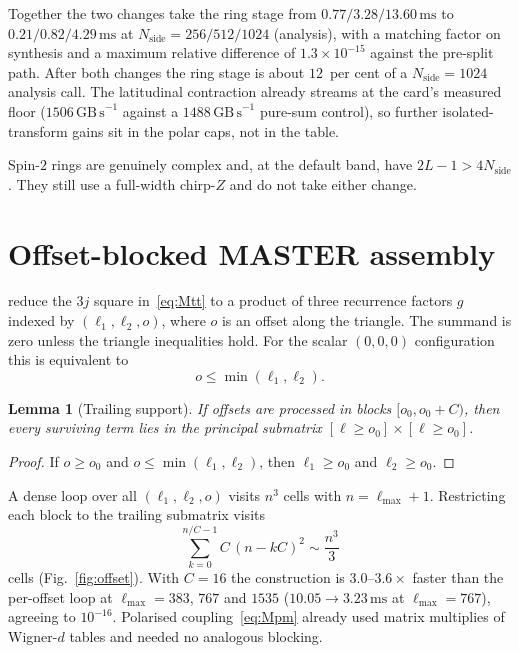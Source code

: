 \documentclass[usenatbib,useAMS]{mnras}
\newtheorem{lemma}{Lemma}
\begin{document}
Together the two changes take the ring stage from $0.77/3.28/13.60\,\mathrm{ms}$ to $0.21/0.82/4.29\,\mathrm{ms}$ at $N_{\mathrm{side}}=256/512/1024$ (analysis), with a matching factor on synthesis and a maximum relative difference of $1.3\times10^{-15}$ against the pre-split path. After both changes the ring stage is about $12$~per cent of a $N_{\mathrm{side}}=1024$ analysis call. The latitudinal contraction already streams at the card's measured floor ($1506\,\mathrm{GB\,s}^{-1}$ against a $1488\,\mathrm{GB\,s}^{-1}$ pure-sum control), so further isolated-transform gains sit in the polar caps, not in the table.

Spin-$2$ rings are genuinely complex and, at the default band, have $2L-1>4N_{\mathrm{side}}$. They still use a full-width chirp-$Z$ and do not take either change.

\section{Offset-blocked MASTER assembly}

\citet{kiddier2026} reduce the $3j$ square in~\eqref{eq:Mtt} to a product of three recurrence factors $g$ indexed by $(\ell_1,\ell_2,o)$, where $o$ is an offset along the triangle. The summand is zero unless the triangle inequalities hold. For the scalar $(0,0,0)$ configuration this is equivalent to
\begin{equation}
  o\le\min(\ell_1,\ell_2).
  \label{eq:offset}
\end{equation}

\begin{lemma}[Trailing support]
If offsets are processed in blocks $[o_0,o_0+C)$, then every surviving term lies in the principal submatrix $[\ell\ge o_0]\times[\ell\ge o_0]$.
\end{lemma}

\begin{proof}
If $o\ge o_0$ and $o\le\min(\ell_1,\ell_2)$, then $\ell_1\ge o_0$ and $\ell_2\ge o_0$.
\end{proof}

A dense loop over all $(\ell_1,\ell_2,o)$ visits $n^3$ cells with $n=\ell_{\max}+1$. Restricting each block to the trailing submatrix visits
\begin{equation}
  \sum_{k=0}^{n/C-1} C\,(n-kC)^2 \sim \frac{n^3}{3}
\end{equation}
cells (Fig.~\ref{fig:offset}). With $C=16$ the construction is $3.0$--$3.6\times$ faster than the per-offset loop at $\ell_{\max}=383$, $767$ and $1535$ ($10.05\to3.23\,\mathrm{ms}$ at $\ell_{\max}=767$), agreeing to $10^{-16}$. Polarised coupling~\eqref{eq:Mpm} already used matrix multiplies of Wigner-$d$ tables and needed no analogous blocking.
\end{document}
